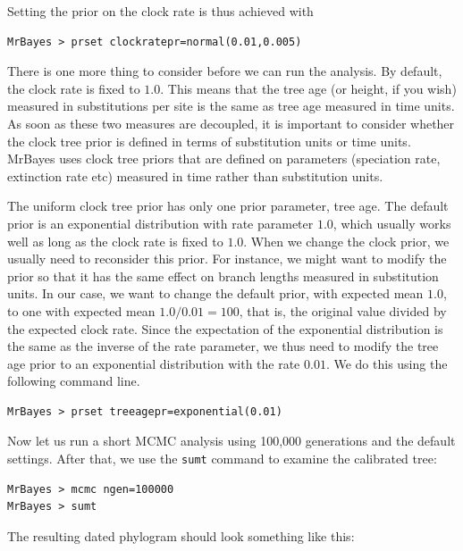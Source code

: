 \documentclass[12pt]{book}
\newcommand{\ttt}[1]{\texttt{#1} }
\begin{document}
Setting the prior on the clock rate is thus achieved with

\begin{verbatim}
MrBayes > prset clockratepr=normal(0.01,0.005)
\end{verbatim}

There is one more thing to consider before we can run the analysis. By default, the clock rate is
fixed to $1.0$.  This means that the tree age (or height, if you wish) measured in substitutions
per site is the same as tree age measured in time units. As soon as these two measures are
decoupled, it is important to consider whether the clock tree prior is defined in terms of
substitution units or time units. MrBayes uses clock tree priors that are defined on parameters
(speciation rate, extinction rate etc) measured in time rather than substitution units.

The uniform clock tree prior has only one prior parameter, tree age. The default prior is an
exponential distribution with rate parameter $1.0$, which usually works well as long as the clock
rate is fixed to $1.0$.  When we change the clock prior, we usually need to reconsider this prior.
For instance, we might want to modify the prior so that it has the same effect on branch lengths
measured in substitution units. In our case, we want to change the default prior, with expected
mean $1.0$, to one with expected mean $1.0 / 0.01 = 100$, that is, the original value divided by
the expected clock rate. Since the expectation of the exponential distribution is the same as the
inverse of the rate parameter, we thus need to modify the tree age prior to an exponential
distribution with the rate $0.01$. We do this using the following command line.

\begin{verbatim}
MrBayes > prset treeagepr=exponential(0.01)
\end{verbatim}

Now let us run a short MCMC analysis using 100,000 generations and the default settings. After
that, we use the \ttt{sumt} command to examine the calibrated tree:

\begin{singlespacing}
\begin{verbatim}
MrBayes > mcmc ngen=100000
MrBayes > sumt
\end{verbatim}
\end{singlespacing}

The resulting dated phylogram should look something like this:
\end{document}

